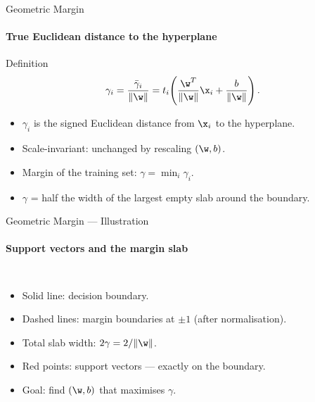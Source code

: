 \begin{frame}{Geometric Margin}
  \framesubtitle{True Euclidean distance to the hyperplane}
  \begin{block}{Definition}
    \[
      \gamma_i = \frac{\bar{\gamma}_i}{\|\w\|} = t_i\!\left(\frac{\w^T}{\|\w\|}\x_i + \frac{b}{\|\w\|}\right).
    \]
  \end{block}
  \begin{itemize}
    \item $\gamma_i$ is the \alert{signed Euclidean distance} from $\x_i$ to the hyperplane.
    \item \alert{Scale-invariant}: unchanged by rescaling $(\w,b)$.
    \item Margin of the training set: $\gamma = \min_i \gamma_i$.
    \item $\gamma$ = half the width of the largest empty slab around the boundary.
  \end{itemize}
\end{frame}

\begin{frame}{Geometric Margin — Illustration}
  \framesubtitle{Support vectors and the margin slab}
  \begin{columns}
      \begin{itemize}
        \item Solid line: \alert{decision boundary}.
        \item Dashed lines: \alert{margin boundaries} at $\pm 1$ (after normalisation).
        \item Total slab width: $2\gamma = 2/\|\w\|$.
        \item Red points: \alert{support vectors} — exactly on the boundary.
        \item Goal: find $(\w, b)$ that \alert{maximises} $\gamma$.
      \end{itemize}
  \end{columns}
\end{frame}

